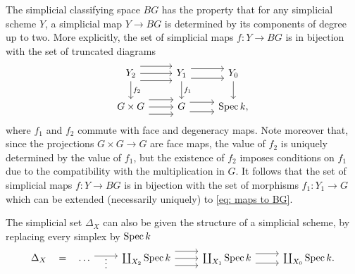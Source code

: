 \begin{rmk}\cite[See][Lemma I.3.5]{SimplicialHomotopyTheory} \label{BG is 2-coskeleton}
The simplicial classifying space $BG$ has the property that for any simplicial scheme $Y$, a simplicial map $Y \to BG$ is determined by its components of degree up to two. More explicitly, the set of simplicial maps $ f \colon Y \to BG$ is in bijection with the set of truncated diagrams
\begin{equation} \label{eq: maps to BG}
\begin{tikzcd}
	{Y_2} & {Y_1} & {Y_0} \\
	{G \times G} & G & {\Spec k,}
	\arrow[from=1-1, to=1-2]
	\arrow[shift left=3, from=1-1, to=1-2]
	\arrow[shift right=3, from=1-1, to=1-2]
	\arrow["{f_2}", from=1-1, to=2-1]
	\arrow[shift right=2, from=1-2, to=1-3]
	\arrow[shift left=2, from=1-2, to=1-3]
	\arrow["{f_1}", from=1-2, to=2-2]
	\arrow[from=1-3, to=2-3]
	\arrow[from=2-1, to=2-2]
	\arrow[shift left=3, from=2-1, to=2-2]
	\arrow[shift right=3, from=2-1, to=2-2]
	\arrow[shift right=2, from=2-2, to=2-3]
	\arrow[shift left=2, from=2-2, to=2-3]
\end{tikzcd}
\end{equation}
where $f_1$ and $f_2$ commute with face and degeneracy maps. Note moreover that, since the projections $G \times G \to G$ are face maps, the value of $f_2$ is uniquely determined by the value of $f_1$, but the existence of $f_2$ imposes conditions on $f_1$ due to the compatibility with the multiplication in $G$. It follows that the set of simplicial maps $f \colon  Y \to BG$ is in bijection with the set of morphisms $f_1 \colon  Y_1 \to G$ which can be extended (necessarily uniquely) to \eqref{eq: maps to BG}.
\end{rmk}


The simplicial set $\Delta_X$ can also be given the structure of a simplicial scheme, by replacing every simplex by $\operatorname{Spec} k$
\begin{equation}
\begin{tikzcd}
	{\Delta_{X}} & \dots & {\coprod_{X_2} \Spec k} & {\coprod_{X_1} \Spec k} & {\coprod_{X_0} \Spec k.}
	\arrow["{=}"{marking, allow upside down}, draw=none, from=1-1, to=1-2]
	\arrow["\vdots"'{yshift=5pt}, shift left, from=1-2, to=1-3]
	\arrow[from=1-3, to=1-4]
	\arrow[shift left=3, from=1-3, to=1-4]
	\arrow[shift right=3, from=1-3, to=1-4]
	\arrow[shift right=2, from=1-4, to=1-5]
	\arrow[shift left=2, from=1-4, to=1-5]
\end{tikzcd}
\end{equation}

